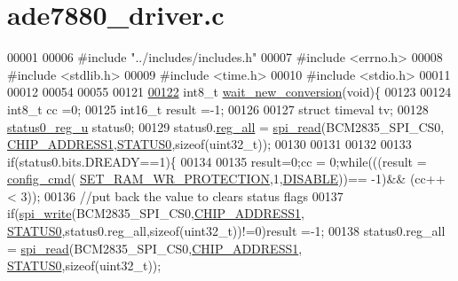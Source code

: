 \hypertarget{a00035}{\section{ade7880\-\_\-driver.\-c}
\label{d4/d8c/a00035}
}

\begin{DoxyCode}
00001 
00006 \textcolor{preprocessor}{#include "../includes/includes.h"}
00007 \textcolor{preprocessor}{#include <errno.h>}
00008 \textcolor{preprocessor}{#include <stdlib.h>}
00009 \textcolor{preprocessor}{#include <time.h>} 
00010 \textcolor{preprocessor}{#include <stdio.h>}    
00011 
00012 
00054 
00055 
00121 
\hypertarget{a00035_source_l00122}{}\hyperlink{a00003_ga7b6d584350762c53419945480d6958d3}{00122} int8\_t \hyperlink{a00003_ga7b6d584350762c53419945480d6958d3}{wait\_new\_conversion}(\textcolor{keywordtype}{void})\{
00123 
00124            int8\_t cc =0;
00125            int16\_t result =-1;
00126     
00127            \textcolor{keyword}{struct }timeval tv;
00128            \hyperlink{a00032}{status0\_reg\_u} status0;
00129            status0.\hyperlink{a00032_ae44a0232a79ff51b5ef7aa80e4b35470}{reg\_all} = \hyperlink{a00007_ga7ad9f65ee46aca507374096506a0b1c4}{spi\_read}(BCM2835\_SPI\_CS0,
      \hyperlink{a00037_a94de2b046db6e10257ef4481c0a15eaa}{CHIP\_ADDRESS1},\hyperlink{a00036_aaf584f70289e5fd799fef97c85bb97ee}{STATUS0},\textcolor{keyword}{sizeof}(uint32\_t));
00130           
00131            
00132         
00133            \textcolor{keywordflow}{if}(status0.bits.DREADY==1)\{
00134     
00135            result=0;cc = 0;\textcolor{keywordflow}{while}(((result = \hyperlink{a00005_ga369ee0e8379941cbc2c79b90ec3292da}{config\_cmd}(
      \hyperlink{a00043_a5b534b9caab512045a6e762f3930a501}{SET\_RAM\_WR\_PROTECTION},1,\hyperlink{a00037_a99496f7308834e8b220f7894efa0b6ab}{DISABLE}))== -1)&& (cc++ < 3));  
00136            \textcolor{comment}{//put back the value to clears status flags         }
00137            \textcolor{keywordflow}{if}(\hyperlink{a00007_ga2770219ad8ad1eda1817c0df934b47d0}{spi\_write}(BCM2835\_SPI\_CS0,\hyperlink{a00037_a94de2b046db6e10257ef4481c0a15eaa}{CHIP\_ADDRESS1},
      \hyperlink{a00036_aaf584f70289e5fd799fef97c85bb97ee}{STATUS0},status0.reg\_all,\textcolor{keyword}{sizeof}(uint32\_t))!=0)result =-1; 
00138            status0.reg\_all = \hyperlink{a00007_ga7ad9f65ee46aca507374096506a0b1c4}{spi\_read}(BCM2835\_SPI\_CS0,\hyperlink{a00037_a94de2b046db6e10257ef4481c0a15eaa}{CHIP\_ADDRESS1},
      \hyperlink{a00036_aaf584f70289e5fd799fef97c85bb97ee}{STATUS0},\textcolor{keyword}{sizeof}(uint32\_t));

\end{DoxyCode}

